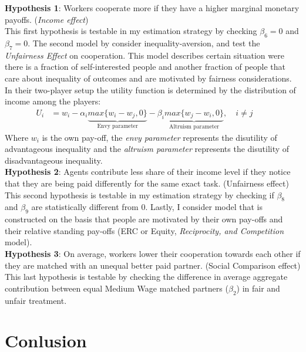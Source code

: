 \documentclass[a4paper, 12pt]{article}
\begin{document}
\textbf{Hypothesis 1}: Workers cooperate more if they have a higher marginal monetary payoffs. (\textit{Income effect}) \\

This first hypothesis is testable in my estimation strategy by checking $\beta_6 = 0$ and  $\beta_7 = 0$. The second model by \cite{Fehr1999} consider inequality-aversion, and test the \textit{Unfairness Effect} on cooperation. This model describes certain situation were there is a fraction of self-interested people and another fraction of people that care about inequality of outcomes and are motivated by fairness considerations. In their two-player setup the utility function is determined by the distribution of income among the players: 
\begin{equation}
\begin{aligned}
U_i &= w_i - \alpha_i \underbrace{max\{w_i-w_j,0\}}_\text{Envy parameter} - \beta_i \underbrace{max\{w_j-w_i,0\}}_\text{Altruism parameter}, \quad i\neq j \quad \quad
\end{aligned}
\end{equation}
Where $w_i$ is the own pay-off, the \textit{envy parameter} represents the disutility of advantageous inequality and the \textit{altruism parameter} represents the disutility of disadvantageous inequality.\\

\textbf{Hypothesis 2}: Agents contribute less share of their income level if they notice that they are being paid differently for the same exact task. (Unfairness effect) \\

This second hypothesis is testable in my estimation strategy by checking if $\beta_8$ and $\beta_9$ are statistically different from 0. Lastly, I consider \cite{Bolton2000} model that is constructed on the basis that people are motivated by their own pay-offs and their relative standing pay-offs (ERC or Equity, \textit{Reciprocity, and Competition} model). \\

\textbf{Hypothesis 3}: On average, workers lower their cooperation towards each other if they are matched with an unequal better paid partner. (Social Comparison effect)\\

This last hypothesis is testable by checking the difference in average aggregate contribution between equal Medium Wage matched partners ($\beta_2$) in fair and unfair treatment.


\section{Conlusion}
\end{document}

